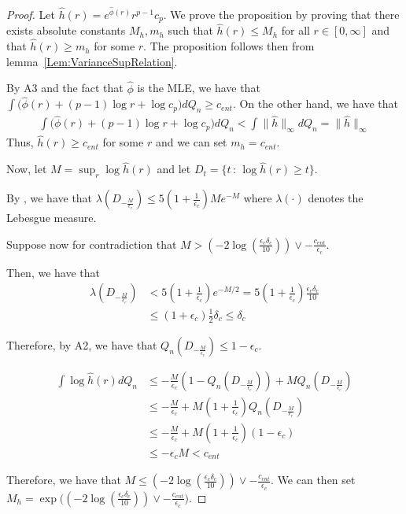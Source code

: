 \documentclass[12pt]{article}
\begin{document}
\begin{proof}

  Let $\hat{h}(r) = e^{\hat{\phi}(r)} r^{p-1} c_p$. We prove the proposition by proving that there exists
  absolute constants $M_h, m_h$ such that $\hat{h}(r) \leq M_h$ for all $r \in [0, \infty]$ and that $\hat{h}(r) \geq m_h$ for some $r$. The proposition follows then from lemma~\ref{Lem:VarianceSupRelation}.

  By A3 and the fact that $\hat{\phi}$ is the MLE, we have that $\int \Big( \hat{\phi}(r) + (p-1) \log r + \log c_p \Big) d Q_n \geq c_{ent}$. On the other hand, we have that
  \begin{align*}
    \int \Big( \hat{\phi}(r) + (p-1) \log r + \log c_p \Big) d Q_n < \int \| \hat{h} \|_\infty  d Q_n = \| \hat{h} \|_\infty
  \end{align*}
  Thus,  $\hat{h}(r) \geq c_{ent}$ for some $r$ and we can set $m_h = c_{ent}$.

  
  Now, let $M = \sup_r \log \hat{h}(r)$ and let $D_t = \{t \,:\, \log \hat{h}(r) \geq t \}$. 

  By \cite[][Lemma~4.1]{dumbgen2011approximation}, we have that $\lambda( D_{-\frac{M}{\epsilon_c}} ) \leq 5 (1 + \frac{1}{\epsilon_c}) M e^{-M} $ where $\lambda(\cdot)$ denotes the Lebesgue measure.

  Suppose now for contradiction that $M > (- 2 \log \left( \frac{\epsilon_c \delta_c }{10} \right)) \vee - \frac{c_{ent}}{\epsilon_c}$.

    Then, we have that
    \begin{align*}
      \lambda( D_{- \frac{M}{\epsilon_c}}) &< 5(1+ \frac{1}{\epsilon_c}) e^{- M/2}
                                             = 5(1+ \frac{1}{\epsilon_c}) \frac{\epsilon_c \delta_c}{10} \\
                                           &\leq (1 + \epsilon_c) \frac{1}{2} \delta_c \leq \delta_c
    \end{align*}
      
    Therefore, by A2, we have that $Q_n( D_{- \frac{M}{\epsilon_c}}) \leq 1 - \epsilon_c$.
  
  \begin{align*}
    \int \log \hat{h}(r) d Q_n &\leq - \frac{M}{\epsilon_c}( 1 - Q_n(D_{-\frac{M}{\epsilon_c}}) ) + M Q_n(D_{-\frac{M}{\epsilon_c}}) \\
                               &\leq - \frac{M}{\epsilon_c} + M(1+ \frac{1}{\epsilon_c}) Q_n( D_{-\frac{M}{\epsilon_c}} ) \\
                               &\leq - \frac{M}{\epsilon_c} + M(1+ \frac{1}{\epsilon_c}) (1 - \epsilon_c) \\
                               &\leq - \epsilon_c M < c_{ent}
  \end{align*}
  

  
  Therefore, we have that $M \leq (- 2 \log \left( \frac{\epsilon_c \delta_c }{10} \right)) \vee - \frac{c_{ent}}{\epsilon_c}$. We can then set
  $M_h = \exp \Big( (- 2 \log \left( \frac{\epsilon_c \delta_c }{10} \right)) \vee - \frac{c_{ent}}{\epsilon_c} \Big)$.
  
  \end{proof}
\end{document}
